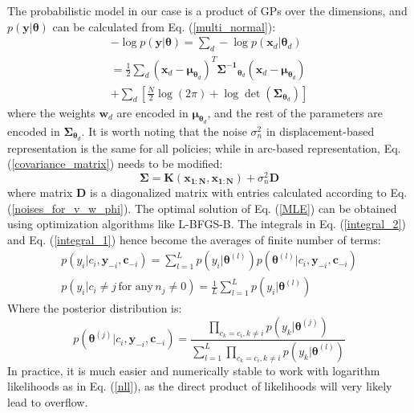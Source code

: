 The probabilistic model in our case is a product of GPs over the dimensions, and $p(\bm{y}|\bm{\theta})$ can be calculated from Eq. (\ref{multi_normal}):
\begin{equation}
\begin{gathered}
-\log p(\bm{y}|\bm{\theta}) = \sum_{d} -\log p(\bm{x}_{d}|\bm{\theta}_d)
\\
= \frac{1}{2} \sum_{d}
(\bm{x}_{ d} - \bm{\mu}_{\bm{\theta}_d})^T \bm{\Sigma^{-1}}_{\bm{\theta}_d} (\bm{x}_{d} - \bm{\mu}_{\bm{\theta}_d})
\\ + \sum_{ d} \left[ \frac{N}{2}\log(2\pi) 
+ \log \det(\bm{\Sigma}_{ \bm{\theta}_d}) \right]
\end{gathered}
\label{nll}
\end{equation}
where the weights $\bm{w}_d$ are encoded in $\bm{\mu}_{\bm{\theta}_d}$, and the rest of the parameters are encoded in $\bm{\Sigma}_{\bm{\theta}_d}$.
It is worth noting that the noise $\sigma_n^2$ in displacement-based representation is the same for all policies; while in arc-based representation, Eq. (\ref{covariance_matrix}) needs to be modified:
\begin{equation}
\bm{\Sigma} = \bm{K}(\bm{x_{1:N}}, \bm{x_{1:N}}) + \sigma_{n}^2 \bm{D}
\label{modified_covariance_matrix}
\end{equation}
where matrix $\bm{D}$ is a diagonalized matrix with entries calculated according to Eq. (\ref{noises_for_v_w_phi}).
The optimal solution of Eq. (\ref{MLE}) can be obtained using optimization algorithms like L-BFGS-B. The integrals in Eq. (\ref{integral_2}) and Eq. (\ref{integral_1}) hence become the averages of finite number of terms:
\begin{equation}
\begin{gathered}
p(y_i|c_i, \bm{y}_{-i}, \bm{c}_{-i}) = 
\sum_{l=1}^L p(y_i|\bm{\theta}^{(l)})
p(\bm{\theta}^{(l)}|c_i, \bm{y}_{-i}, \bm{c}_{-i})
\\
p(y_i|c_i \neq j \, \text{for any} \, n_j \neq 0) = 
\frac{1}{L} \sum_{l=1}^L p(y_i|\bm{\theta}^{(l)})
\end{gathered}
\label{MC_prior_integral}
\end{equation}
Where the posterior distribution is:
\begin{equation}
p(\bm{\theta}^{(j)}|c_i, \bm{y}_{-i}, \bm{c}_{-i}) = 
\frac{
\prod_{c_k=c_i, k \neq i} p(y_k|\bm{\theta}^{(j)})}
{\sum_{l=1}^L \prod_{c_k=c_i, k \neq i} p(y_k|\bm{\theta}^{(l)})}
\label{MC_posterior}
\end{equation}
In practice, it is much easier and numerically stable to work with logarithm likelihoods as in Eq. (\ref{nll}), as the direct product of likelihoods will very likely lead to overflow.


